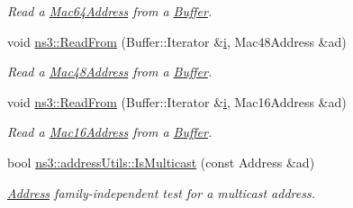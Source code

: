 \begin{DoxyCompactItemize}
\begin{DoxyCompactList}\small\item\em Read a \hyperlink{classns3_1_1Mac64Address}{Mac64\+Address} from a \hyperlink{classns3_1_1Buffer}{Buffer}. \end{DoxyCompactList}\item 
void \hyperlink{namespacens3_a90e4f6909137ffaf4c5a82ddbe334702}{ns3\+::\+Read\+From} (Buffer\+::\+Iterator \&\hyperlink{lte__uplink__power__control_8m_a6f6ccfcf58b31cb6412107d9d5281426}{i}, Mac48\+Address \&ad)
\begin{DoxyCompactList}\small\item\em Read a \hyperlink{classns3_1_1Mac48Address}{Mac48\+Address} from a \hyperlink{classns3_1_1Buffer}{Buffer}. \end{DoxyCompactList}\item 
void \hyperlink{namespacens3_aa56dc030fae9d8f59961c6f1c3039b11}{ns3\+::\+Read\+From} (Buffer\+::\+Iterator \&\hyperlink{lte__uplink__power__control_8m_a6f6ccfcf58b31cb6412107d9d5281426}{i}, Mac16\+Address \&ad)
\begin{DoxyCompactList}\small\item\em Read a \hyperlink{classns3_1_1Mac16Address}{Mac16\+Address} from a \hyperlink{classns3_1_1Buffer}{Buffer}. \end{DoxyCompactList}\item 
bool \hyperlink{namespacens3_1_1addressUtils_a2806342189d7bd73179d40bbf81bdb41}{ns3\+::address\+Utils\+::\+Is\+Multicast} (const Address \&ad)
\begin{DoxyCompactList}\small\item\em \hyperlink{classns3_1_1Address}{Address} family-\/independent test for a multicast address. \end{DoxyCompactList}\end{DoxyCompactItemize}
